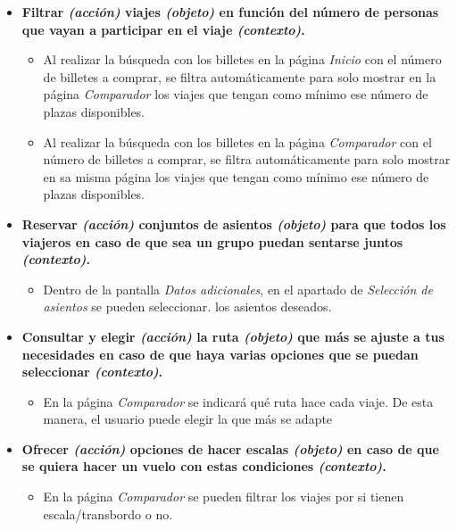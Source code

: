 \begin{itemize}
    \item \textbf{Filtrar \textit{(acción)} viajes \textit{(objeto)} en función del número de personas que vayan a participar en el viaje \textit{(contexto)}.}
        \begin{itemize}
            \item Al realizar la búsqueda con los billetes en la página \textit{Inicio} con el número de billetes a comprar, se filtra automáticamente para solo mostrar
                en la página \textit{Comparador} los viajes que tengan como mínimo ese número de plazas disponibles.
            \item Al realizar la búsqueda con los billetes en la página \textit{Comparador} con el número de billetes a comprar, se filtra automáticamente para solo mostrar
                en sa misma página los viajes que tengan como mínimo ese número de plazas disponibles.
        \end{itemize}

    \item \textbf{Reservar \textit{(acción)} conjuntos de asientos \textit{(objeto)} para que todos los viajeros en caso de que sea un grupo puedan
        sentarse juntos \textit{(contexto)}.}
        \begin{itemize}
            \item Dentro de la pantalla \textit{Datos adicionales}, en el apartado de \textit{Selección de asientos} se pueden seleccionar.
                los asientos deseados.
        \end{itemize}

    \item \textbf{Consultar y elegir \textit{(acción)} la ruta \textit{(objeto)} que más se ajuste a tus necesidades en caso de que haya varias opciones que se puedan seleccionar \textit{(contexto)}.}
        \begin{itemize}
            \item En la página \textit{Comparador} se indicará qué ruta hace cada viaje. De esta manera, el usuario puede elegir la que más se adapte
        \end{itemize}

    \item \textbf{Ofrecer \textit{(acción)} opciones de hacer escalas \textit{(objeto)} en caso de que se quiera hacer un vuelo con estas condiciones \textit{(contexto)}.}
        \begin{itemize}
            \item En la página \textit{Comparador} se pueden filtrar los viajes por si tienen escala/transbordo o no.
        \end{itemize}


\end{itemize}
